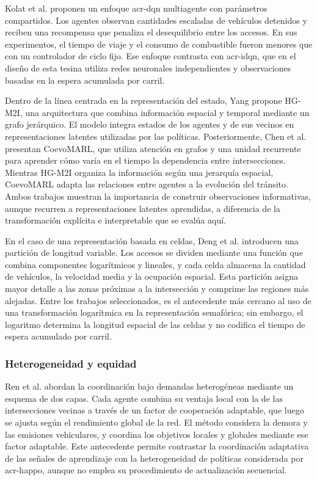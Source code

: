 Kolat et al. \cite{kolat2023cooperative} proponen un enfoque \acrshort{acr-dqn} multiagente con parámetros compartidos. Los agentes observan cantidades escaladas de vehículos detenidos y reciben una recompensa que penaliza el desequilibrio entre los accesos. En sus experimentos, el tiempo de viaje y el consumo de combustible fueron menores que con un controlador de ciclo fijo. Ese enfoque contrasta con \acrshort{acr-idqn}, que en el diseño de esta tesina utiliza redes neuronales independientes y observaciones basadas en la espera acumulada por carril.

Dentro de la línea centrada en la representación del estado, Yang \cite{yang2023hierarchical} propone HG-M2I, una arquitectura que combina información espacial y temporal mediante un grafo jerárquico. El modelo integra estados de los agentes y de sus vecinos en representaciones latentes utilizadas por las políticas. Posteriormente, Chen et al. \cite{chen2024coevo} presentan CoevoMARL, que utiliza atención en grafos y una unidad recurrente para aprender cómo varía en el tiempo la dependencia entre intersecciones. Mientras HG-M2I organiza la información según una jerarquía espacial, CoevoMARL adapta las relaciones entre agentes a la evolución del tránsito. Ambos trabajos muestran la importancia de construir observaciones informativas, aunque recurren a representaciones latentes aprendidas, a diferencia de la transformación explícita e interpretable que se evalúa aquí.

En el caso de una representación basada en celdas, Deng et al. \cite{deng2026roadpartition} introducen una partición de longitud variable. Los accesos se dividen mediante una función que combina componentes logarítmicos y lineales, y cada celda almacena la cantidad de vehículos, la velocidad media y la ocupación espacial. Esta partición asigna mayor detalle a las zonas próximas a la intersección y comprime las regiones más alejadas. Entre los trabajos seleccionados, es el antecedente más cercano al uso de una transformación logarítmica en la representación semafórica; sin embargo, el logaritmo determina la longitud espacial de las celdas y no codifica el tiempo de espera acumulado por carril.

\subsubsection{Heterogeneidad y equidad}

Ren et al. \cite{ren2024twolayer} abordan la coordinación bajo demandas heterogéneas mediante un esquema de dos capas. Cada agente combina su ventaja local con la de las intersecciones vecinas a través de un factor de cooperación adaptable, que luego se ajusta según el rendimiento global de la red. El método considera la demora y las emisiones vehiculares, y coordina los objetivos locales y globales mediante ese factor adaptable. Este antecedente permite contrastar la coordinación adaptativa de las señales de aprendizaje con la heterogeneidad de políticas considerada por \acrshort{acr-happo}, aunque no emplea su procedimiento de actualización secuencial.

